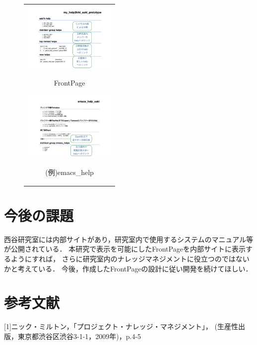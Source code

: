 \documentclass[10pt,a4j,twocolumn]{jsarticle}
\begin{document}
\begin{figure}[htbp]
\begin{center}
\begin{tabular}{c}
\begin{minipage}{0.5\hsize}
\begin{center}
\includegraphics[width=4.5cm,bb=100 100 1000 1000]{my_help2hiki_saki.014.png}
\end{center}
\hspace{1cm} FrontPage

\end{minipage}
\begin{minipage}{0.5\hsize}
\begin{center}
\includegraphics[width=4.5cm,bb=100 100 1000 1000]{my_help2hiki_saki.015.png}
\end{center}
\hspace{1cm} (例)emacs\_help

\end{minipage}
\end{tabular}
\end{center}
\end{figure}

\section{今後の課題}
西谷研究室には内部サイトがあり，研究室内で使用するシステムのマニュアル等が公開されている．
本研究で表示を可能にしたFrontPageを内部サイトに表示するようにすれば，
さらに研究室内のナレッジマネジメントに役立つのではないかと考えている．
今後，作成したFrontPageの設計に従い開発を続けてほしい．

\section{参考文献}
[1]ニック・ミルトン，「プロジェクト・ナレッジ・マネジメント」，
(生産性出版，東京都渋谷区渋谷3-1-1，2009年)，p.4-5
\end{document}
